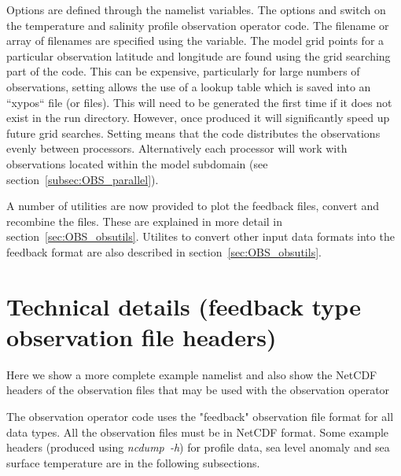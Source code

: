 \documentclass[../tex_main/NEMO_manual]{subfiles}
\begin{document}
%

Options are defined through the   namelist variables.
The options  and  switch on the temperature and salinity
profile observation operator code. The filename or array of filenames are
specified using the  variable. The model grid points for a
particular  observation latitude and longitude are found using the grid
searching part of the code. This can be expensive, particularly for large
numbers of observations, setting  allows the use of
a lookup table which is saved into an ``xypos`` file (or files). This will need
to be generated the first time if it does not exist in the run directory.
However, once produced it will significantly speed up future grid searches.
Setting  means that the code distributes the observations
evenly between processors. Alternatively each processor will work with
observations located within the model subdomain (see section~\autoref{subsec:OBS_parallel}).

A number of utilities are now provided to plot the feedback files, convert and
recombine the files. These are explained in more detail in section~\autoref{sec:OBS_obsutils}.
Utilites to convert other input data formats into the feedback format are also 
described in section~\autoref{sec:OBS_obsutils}.

\section{Technical details (feedback type observation file headers)}
\label{sec:OBS_details}

Here we show a more complete example namelist   and also show the NetCDF headers
of the observation
files that may be used with the observation operator



The observation operator code uses the "feedback" observation file format for
all data types. All the
observation files must be in NetCDF format. Some example headers (produced using
\mbox{\textit{ncdump~-h}}) for profile
data, sea level anomaly and sea surface temperature are in the following
subsections.
\end{document}
